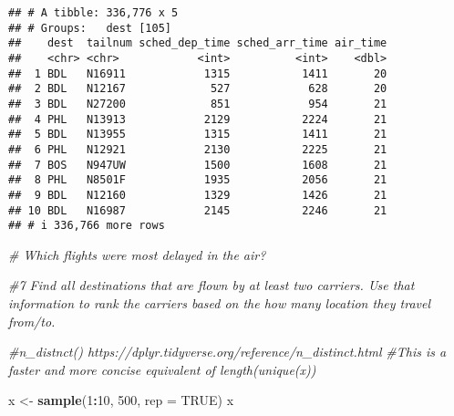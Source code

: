 \documentclass[
]{article}
\newenvironment{Shaded}{\begin{snugshade}}{\end{snugshade}}
\newcommand{\AttributeTok}[1]{\textcolor[rgb]{0.13,0.29,0.53}{#1}}
\newcommand{\CommentTok}[1]{\textcolor[rgb]{0.56,0.35,0.01}{\textit{#1}}}
\newcommand{\ConstantTok}[1]{\textcolor[rgb]{0.56,0.35,0.01}{#1}}
\newcommand{\DecValTok}[1]{\textcolor[rgb]{0.00,0.00,0.81}{#1}}
\newcommand{\FunctionTok}[1]{\textcolor[rgb]{0.13,0.29,0.53}{\textbf{#1}}}
\newcommand{\NormalTok}[1]{#1}
\newcommand{\OtherTok}[1]{\textcolor[rgb]{0.56,0.35,0.01}{#1}}
\newcommand{\SpecialCharTok}[1]{\textcolor[rgb]{0.81,0.36,0.00}{\textbf{#1}}}
\begin{document}
\begin{verbatim}
## # A tibble: 336,776 x 5
## # Groups:   dest [105]
##    dest  tailnum sched_dep_time sched_arr_time air_time
##    <chr> <chr>            <int>          <int>    <dbl>
##  1 BDL   N16911            1315           1411       20
##  2 BDL   N12167             527            628       20
##  3 BDL   N27200             851            954       21
##  4 PHL   N13913            2129           2224       21
##  5 BDL   N13955            1315           1411       21
##  6 PHL   N12921            2130           2225       21
##  7 BOS   N947UW            1500           1608       21
##  8 PHL   N8501F            1935           2056       21
##  9 BDL   N12160            1329           1426       21
## 10 BDL   N16987            2145           2246       21
## # i 336,766 more rows
\end{verbatim}

\begin{Shaded}
\begin{Highlighting}[]
\CommentTok{\# Which flights were most delayed in the air?}
\end{Highlighting}
\end{Shaded}

\begin{Shaded}
\begin{Highlighting}[]
\CommentTok{\#7  Find all destinations that are flown by at least two carriers. Use that information to rank the carriers based on the how many location they travel from/to.}

\CommentTok{\#n\_distnct() https://dplyr.tidyverse.org/reference/n\_distinct.html}
\CommentTok{\#This is a faster and more concise equivalent of length(unique(x))}

\NormalTok{x }\OtherTok{\textless{}{-}} \FunctionTok{sample}\NormalTok{(}\DecValTok{1}\SpecialCharTok{:}\DecValTok{10}\NormalTok{, }\DecValTok{500}\NormalTok{, }\AttributeTok{rep =} \ConstantTok{TRUE}\NormalTok{)}
\NormalTok{x}
\end{Highlighting}
\end{Shaded}
\end{document}
